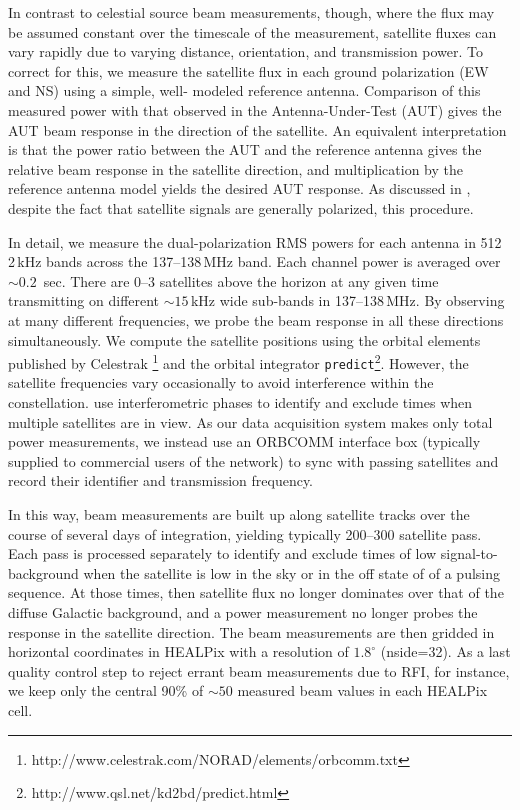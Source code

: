 \documentclass[preprint]{aastex}
\begin{document}
In contrast to celestial source beam measurements, though, where the flux may be 
assumed constant over the timescale of the measurement, satellite fluxes can vary rapidly 
due to varying distance, orientation, and transmission power. To correct for this, we 
measure the satellite flux in each ground polarization (EW and NS) using a simple, well-
modeled reference antenna. Comparison of this measured power with that observed in the 
Antenna-Under-Test (AUT) gives the AUT beam response in the direction of the satellite. 
An equivalent interpretation is that the power ratio between the AUT and the reference 
antenna gives the relative beam response in the satellite direction, and multiplication by 
the reference antenna model yields the desired AUT response. As discussed in 
\citet{neben15}, despite the fact that satellite signals are generally polarized, this 
procedure.

In detail, we measure the dual-polarization RMS powers for each antenna in 512 2\,kHz 
bands across the 137--138\,MHz band. Each channel power is averaged over $\sim0.2$
\,sec. There are 0--3 satellites above the horizon at any given time transmitting on different 
$\sim15$\,kHz wide sub-bands in 137--138\,MHz. By observing at many different 
frequencies, we probe the beam response in all these directions simultaneously. We 
compute the satellite positions using the orbital elements published by Celestrak
\footnote{http://www.celestrak.com/NORAD/elements/orbcomm.txt} and the orbital 
integrator \texttt{predict}\footnote{http://www.qsl.net/kd2bd/predict.html}. However, the 
satellite frequencies vary occasionally to avoid interference within the constellation. 
\citet{zheng14} use interferometric phases to identify and exclude times when multiple 
satellites are in view. As our data acquisition system makes only total power 
measurements, we instead use an ORBCOMM interface box (typically supplied to 
commercial users of the network) to sync with passing satellites and record their identifier 
and transmission frequency.

In this way, beam measurements are built up along satellite tracks over the course of 
several days of integration, yielding typically 200--300 satellite pass. Each pass is 
processed separately to identify and exclude times of low signal-to-background when the 
satellite is low in the sky or in the off state of of a pulsing sequence. At those times, then 
satellite flux no longer dominates over that of the diffuse Galactic background, and a 
power measurement no longer probes the response in the satellite direction. The beam 
measurements are then gridded in horizontal coordinates in HEALPix with a resolution of 
$1.8^\circ$ (nside=32). As a last quality control step to reject errant beam measurements 
due to RFI, for instance, we keep only the central 90\% of $\sim50$ measured beam 
values in each HEALPix cell.
\end{document}
